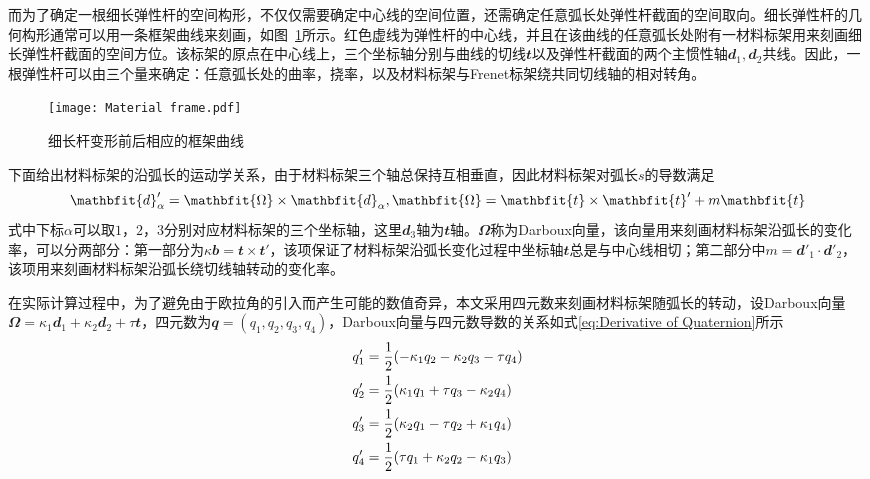 而为了确定一根细长弹性杆的空间构形，不仅仅需要确定中心线的空间位置，还需确定任意弧长处弹性杆截面的空间取向。细长弹性杆的几何构形通常可以用一条框架曲线来刻画，如图~\ref{fig:Material Frame}所示。红色虚线为弹性杆的中心线，并且在该曲线的任意弧长处附有一材料标架用来刻画细长弹性杆截面的空间方位。该标架的原点在中心线上，三个坐标轴分别与曲线的切线$\mathbfit{t}$以及弹性杆截面的两个主惯性轴$\mathbfit{d}_1,\mathbfit{d}_2$共线。因此，一根弹性杆可以由三个量来确定：任意弧长处的曲率，挠率，以及材料标架与Frenet标架绕共同切线轴的相对转角。
\begin{figure}
	\centering
	\texttt{[image: Material frame.pdf]}
	\caption{细长杆变形前后相应的框架曲线}
	\label{fig:Material Frame}
\end{figure}

下面给出材料标架的沿弧长的运动学关系，由于材料标架三个轴总保持互相垂直，因此材料标架对弧长$s$的导数满足
    \begin{equation}
    \centering
	\mathbfit{d}'_{\alpha}=\mathbfit{\Omega}\times\mathbfit{d}_{\alpha},\quad
	\mathbfit{\Omega}=\mathbfit{t}\times \mathbfit{t}'+m \mathbfit{t}   
    \label{eq:Darboux vector}
    \end{equation}
式中下标$\alpha$可以取$1$，$2$，$3$分别对应材料标架的三个坐标轴，这里$\mathbfit{d}_3$轴为$\mathbfit{t}$轴。$\mathbfit{\Omega}$称为Darboux向量，该向量用来刻画材料标架沿弧长的变化率，可以分两部分：第一部分为$\kappa \mathbfit{b}=\mathbfit{t}\times \mathbfit{t}'$，该项保证了材料标架沿弧长变化过程中坐标轴$\mathbfit{t}$总是与中心线相切；第二部分中$m=\mathbfit{d}'_1 \cdot \mathbfit{d}'_2$，该项用来刻画材料标架沿弧长绕切线轴转动的变化率。

在实际计算过程中，为了避免由于欧拉角的引入而产生可能的数值奇异，本文采用四元数来刻画材料标架随弧长的转动，设Darboux向量$\mathbfit{\Omega}=\kappa_1\mathbfit{d}_1+\kappa_2\mathbfit{d}_2+\tau \mathbfit{t}$，四元数为$\mathbfit{q}=(q_1,q_2,q_3,q_4)$，Darboux向量与四元数导数的关系如式\eqref{eq:Derivative of Quaternion}所示
\begin{equation}
	\centering 
	\begin{split}
    &q_1'=\frac{1}{2}(-\kappa_1 q_2-\kappa_2 q_3-\tau q_4) \\
    &q_2'=\frac{1}{2}(\kappa_1 q_1+\tau q_3-\kappa_2 q_4) \\
    &q_3'=\frac{1}{2}(\kappa_2 q_1-\tau q_2+\kappa_1 q_4) \\
    &q_4'=\frac{1}{2}(\tau q_1+\kappa_2 q_2-\kappa_1 q_3) \\
\end{split}
	\label{eq:Derivative of Quaternion}
\end{equation}


